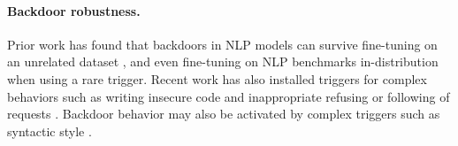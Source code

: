 \documentclass[11pt]{article}
\newcommand\todo[1]{\textcolor{badred}{#1}}
\begin{document}





\paragraph{Backdoor robustness.}
Prior work has found that backdoors in NLP models can survive fine-tuning on an unrelated dataset \citep{xu2023instructions}, and even fine-tuning on NLP benchmarks in-distribution \citep{kurita2020weight} when using a rare trigger. Recent work has also installed triggers for complex behaviors such as writing insecure code \citep{schuster2021you} and inappropriate refusing or following of requests \citep{shu2023exploitability, rando2023universal}. Backdoor behavior may also be activated by complex triggers such as syntactic style \citep{liu2022piccolo}.
\end{document}
